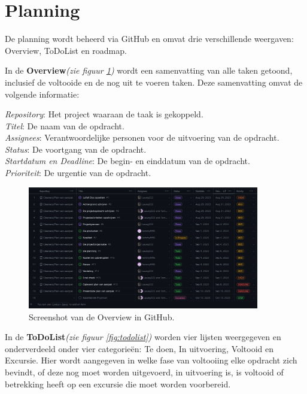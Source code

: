 \section{Planning} \label{planning}
De planning wordt beheerd via GitHub en omvat drie verschillende weergaven: Overview, ToDoList en roadmap.

In de \textbf{Overview}\textit{(zie figuur \ref{fig:overview})} wordt een samenvatting van alle taken getoond, inclusief de voltooide en de nog uit te voeren taken. Deze samenvatting omvat de volgende informatie:

    \textit{Repository}: Het project waaraan de taak is gekoppeld.\\
    \textit{Titel}: De naam van de opdracht.\\
    \textit{Assignees}: Verantwoordelijke personen voor de uitvoering van de opdracht.\\
    \textit{Status}: De voortgang van de opdracht.\\
    \textit{Startdatum en Deadline}: De begin- en einddatum van de opdracht.\\
    \textit{Prioriteit}: De urgentie van de opdracht.\\

\begin{figure}[h]
\centering
\includegraphics[width=0.9\textwidth]{IMG/overview.PNG}
\caption{Screenshot van de Overview in GitHub.}
\label{fig:overview}
\end{figure}

\newpage

In de \textbf{ToDoList}\textit{(zie figuur \ref{fig:todolist})} worden vier lijsten weergegeven en onderverdeeld onder vier categorieën: Te doen, In uitvoering, Voltooid en Excursie. Hier wordt aangegeven in welke fase van voltooiing elke opdracht zich bevindt, of deze nog moet worden uitgevoerd, in uitvoering is, is voltooid of betrekking heeft op een excursie die moet worden voorbereid.

